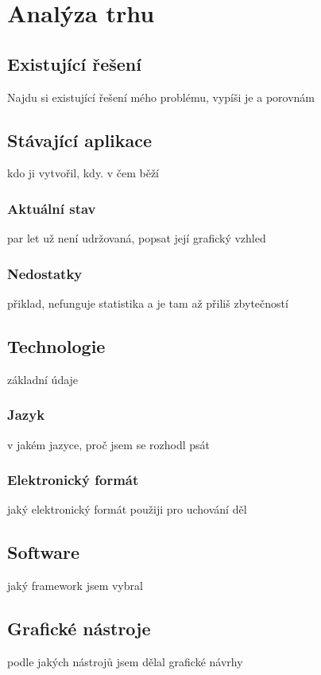 \chapter{Analýza trhu}

    \section{Existující řešení}
        Najdu si existující řešení mého problému, vypíši je a porovnám

    \section{Stávající aplikace}
        kdo ji vytvořil, kdy. v čem běží
        
        \subsection{Aktuální stav}
            par let už není udržovaná, popsat její grafický vzhled
            
        \subsection{Nedostatky}
            přiklad, nefunguje statistika a je tam až přiliš zbytečností
            
    \section{Technologie}
        základní údaje
        \subsection{Jazyk}
            v jakém jazyce, proč jsem se rozhodl psát
        \subsection{Elektronický formát}
            jaký elektronický formát použiji pro uchování děl
    \section{Software}
        jaký framework jsem vybral
    \section{Grafické nástroje}
        podle jakých nástrojů jsem dělal grafické návrhy
